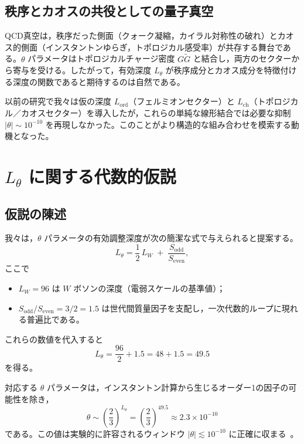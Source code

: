 \documentclass[11pt,a4paper]{article}
\begin{document}
	\subsection{秩序とカオスの共役としての量子真空}
	QCD真空は，秩序だった側面（クォーク凝縮，カイラル対称性の破れ）とカオス的側面（インスタントンゆらぎ，トポロジカル感受率）が共存する舞台である。\(\theta\) パラメータはトポロジカルチャージ密度 \(G\widetilde{G}\) と結合し，両方のセクターから寄与を受ける。したがって，有効深度 \(L_\theta\) が秩序成分とカオス成分を特徴付ける深度の関数であると期待するのは自然である。
	
	以前の研究で我々は仮の深度 \(L_{\mathrm{ord}}\)（フェルミオンセクター）と \(L_{\mathrm{ch}}\)（トポロジカル／カオスセクター）を導入したが，これらの単純な線形結合では必要な抑制 \(|\theta| \sim 10^{-10}\) を再現しなかった。このことがより構造的な組み合わせを模索する動機となった。
	
	\section{\(L_\theta\) に関する代数的仮説}
	\label{sec:hypothesis}
	
	\subsection{仮説の陳述}
	
	我々は，\(\theta\) パラメータの有効調整深度が次の簡潔な式で与えられると提案する。
	\begin{equation}
		\boxed{L_\theta = \frac{1}{2}\,L_W \;+\; \frac{S_{\mathrm{odd}}}{S_{\mathrm{even}}}},
		\label{eq:Ltheta}
	\end{equation}
	ここで
	\begin{itemize}
		\item \(L_W = 96\) は \(W\) ボソンの深度（電弱スケールの基準値）；
		\item \(S_{\mathrm{odd}}/S_{\mathrm{even}} = 3/2 = 1.5\) は世代間質量因子を支配し，一次代数的ループに現れる普遍比である。
	\end{itemize}
	
	これらの数値を代入すると
	\[
	L_\theta = \frac{96}{2} + 1.5 = 48 + 1.5 = 49.5
	\]
	を得る。
	
	対応する \(\theta\) パラメータは，インスタントン計算から生じるオーダー1の因子の可能性を除き，
	\[
	\theta \sim \left(\frac{2}{3}\right)^{L_\theta} = \left(\frac{2}{3}\right)^{49.5} \approx 2.3 \times 10^{-10}
	\]
	である。この値は実験的に許容されるウィンドウ \(|\theta| \lesssim 10^{-10}\) に正確に収まる~\cite{nEDM2020}。
	
\end{document}
